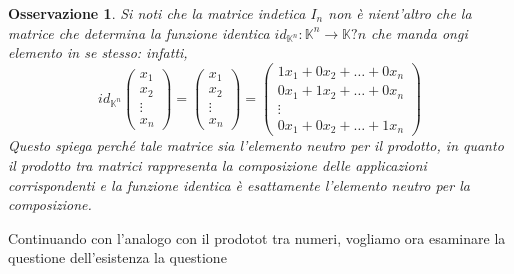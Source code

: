 \documentclass{book}
\newtheorem{osservazione}{Osservazione}
\begin{document}
\begin{osservazione}
  Si noti che la matrice indetica $I_n$ non è nient'altro che la matrice che determina la
  funzione identica $id_{\mathbb{K}^n}:\mathbb{K}^n\to \mathbb{K}?n$ che manda ongi elemento in se
  stesso: infatti,
  \begin{equation}
    id_{\mathbb{K}^n}
    \begin{pmatrix}
      x_1\\
      x_2\\
      \vdots\\
      x_n
    \end{pmatrix}=
    \begin{pmatrix}
      x_1\\
      x_2\\
      \vdots\\
      x_n
    \end{pmatrix}=
    \begin{pmatrix}
      1x_1+0x_2+\dots+0x_n\\
      0x_1+1x_2+\dots+0x_n\\
      \vdots\\
      0x_1+0x_2+\dots+1x_n
    \end{pmatrix}
  \end{equation}
  Questo spiega perché tale matrice sia l'elemento neutro per il prodotto, in quanto il
  prodotto tra matrici rappresenta la composizione delle applicazioni corrispondenti e la funzione identica è esattamente l'elemento neutro per la composizione.
\end{osservazione}
Continuando con l'analogo con il prodotot tra numeri, vogliamo ora esaminare la questione
dell'esistenza la questione 
\end{document}
